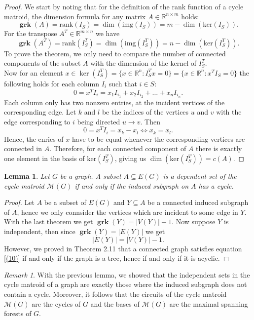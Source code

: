 \documentclass[12pt,a4paper, twoside, autooneside=false]{scrartcl}
\newtheorem{lemma}[theorem]{Lemma}
\theoremstyle{definition}
\theoremstyle{remark}
\newtheorem{remark}[theorem]{Remark}
\numberwithin{equation}{section}
\newcommand{\M}{\mathcal{M}} %
\DeclareMathOperator{\grk}{\mathbf{grk}} %
\begin{document}
\begin{proof}
We start by noting that for the definition of the rank function of a cycle matroid, the dimension formula for any matrix $A \in \mathbb{R}^{n \times m}$ holds: 
\[
\grk(A) = \mathrm{rank}(I_S) = \dim(\mathrm{img}(I_S)) = m - \dim(\mathrm{ker}(I_S)). 
\]
For the transpose $A^T \in \mathbb{R}^{m \times n}$ we have
\[
\grk(A^T) = \mathrm{rank}(I_S^T) = \dim(\mathrm{img}(I_S^T)) = n - \dim(\mathrm{ker}(I_S^T)).
\]
To prove the theorem, we only need to compare the number of connected components of the subset $A$ with the dimension of the kernel of $I_S^T$. \\
\indent Now for an element $x \in \ker(I_S^T) = \{x \in \mathbb{R}^n: I_S^Tx = 0\} = \{x \in \mathbb{R}^n: x^T I_S = 0\}$ the following holds for each column $I_i$ such that $i \in S$: 
\[
0 = x^TI_i = x_1 I_{i_1} + x_2 I_{i_2} + \dots + x_n I_{i_n}. 
\]
Each column only has two nonzero entries, at the incident vertices of the corresponding edge. Let $k$ and $l$ be the indices of the vertices $u$ and $v$ with the edge corresponding to $i$ being directed $u \to v$. Then 
\[
0 = x^T I_i = x_k - x_l \Longleftrightarrow x_k = x_l.
\]
Hence, the enries of $x$ have to be equal whenever the corresponding vertices are connected in $A$. Therefore, for each connected component of $A$ there is exactly one element in the basis of $\mathrm{ker}(I_S^T)$, giving us $\dim(\mathrm{ker}(I_S^T)) = c(A)$.
\end{proof}
\begin{lemma}
Let $G$ be a graph. A subset $A \subseteq E(G)$ is a dependent set of the cycle matroid $\M(G)$ if and only if the induced subgraph on $A$ has a cycle. 
\end{lemma}
\begin{proof}
Let $A$ be a subset of $E(G)$ and $Y \subseteq A$ be a connected induced subgraph of $A$, hence we only connsider the vertices which are incident to some edge in $Y$. With the last theorem we get $\grk(Y) = |V(Y)| - 1$. Now suppose $Y$ is independent, then since $\grk(Y) = |E(Y)|$ we get 
\begin{equation} \label{(10)}
|E(Y)| = |V(Y)| - 1. 
\end{equation}
However, we proved in Theorem 2.11 that a connected graph satisfies equation \eqref{(10)} if and only if the graph is a tree, hence if and only if it is acyclic. 
\end{proof}
\begin{remark}
With the previous lemma, we showed that the independent sets in the cycle matroid of a graph are exactly those where the induced subgraph does not contain a cycle. Moreover, it follows that the circuits of the cycle matroid $\M(G)$ are the cycles of $G$ and the bases of $\M(G)$ are the maximal spanning forests of $G$.
\end{remark}
\end{document}
